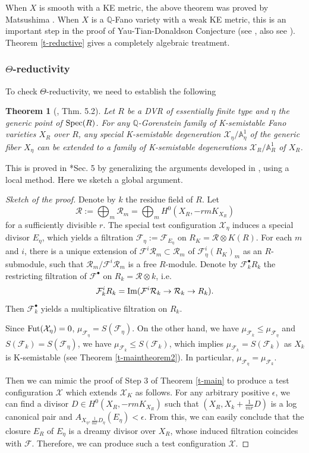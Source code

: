 \documentclass[12pt,reqno]{amsart}%
\newcommand{\bA}{{\mathbb{A} }}
\newcommand{\cR}{{\mathcal{R}}}
\newcommand{\cX}{{\mathcal{X}}}
\newcommand{\cF}{\mathcal{F}}
\newtheorem{thm}{Theorem}[section]
\theoremstyle{definition}
\theoremstyle{remark}
\newcommand{\Fut}{{\rm Fut}}
\newcommand{\Spec}{{\rm Spec}}
\begin{document}
When $X$ is smooth with a KE metric, the above theorem was proved by Matsushima \cite{Mat57}. When $X$ is a $\mathbb{Q}$-Fano variety with a weak KE metric, this is an important step in the proof of Yau-Tian-Donaldson Conjecture (see \cite{CDS, Tia15}, also see \cite{BBEGZ19}). Theorem \ref{t-reductive} gives a completely algebraic treatment. 

\subsubsection{$\Theta$-reductivity}

To check $\Theta$-reductivity, we need to establish the following 
\begin{thm}[{\cite{ABHX19}, Thm. 5.2}]\label{t-thetareductive}
Let $R$ be a DVR of essentially finite type and $\eta$ the generic point of $\Spec(R)$.
For any $\mathbb{Q}$-Gorenstein family of K-semistable Fano varieties $X_R$ over  $R$, any special K-semistable degeneration $\cX_{\eta}/\bA^1_{\eta}$ of the generic fiber $X_{\eta}$ can be extended to a family of K-semistable degenerations $\cX_R/\bA^1_R$ of $X_R$. \end{thm}
This is proved in \cite{ABHX19}*{Sec. 5} by generalizing the arguments developed in \cite{LWX18}, using a local method. Here we sketch a global argument.
\begin{proof}[Sketch of the proof] Denote by $k$ the residue field of $R$.
Let 
$$\cR:=\bigoplus_m \cR_m=\bigoplus_mH^0(X_R, -rmK_{X_R})$$ for a sufficiently divisible $r$.
The special test configuration $\cX_{\eta}$ induces a special divisor $E_{\eta}$, which yields a filtration $ \cF_{\eta}:=\cF_{E_{\eta}}$ on $R_{K}=\cR\otimes K(R)$.  For each $m$ and $i$, there is a unique extension of $ \cF^{i}\cR_m\subset \cR_m$ of $\cF^{i}_{\eta}(R_K)_m$ as an $R$-submodule, such that  $ \cR_m/\cF^i\cR_m$ is a free $R$-module. Denote  by $\cF_k^{\bullet}R_k$ the restricting filtration of $\cF^{\bullet}$ on $R_k=\cR\otimes k$, i.e. 
$$\cF_k^iR_k={\rm Im}(\cF^i\cR_k\to \cR_k\to R_k).$$  Then $\cF_k^{\bullet}$ yields a multiplicative filtration on $R_k$.

Since $\Fut(\cX_{\eta})=0$, $\mu_{\cF_{\eta}}=S(\cF_{\eta})$. On the other hand, we have $\mu_{\cF_k}\le \mu_{\cF_{\eta}}$ and $S(\cF_k)=S(\cF_{\eta})$, we have $\mu_{\cF_k}\le S(\cF_k)$, which implies $\mu_{\cF_k}=S(\cF_k)$ as $X_k$ is K-semistable (see Theorem \ref{t-maintheorem2}). In particular, $\mu_{\cF_{\eta}}=\mu_{\cF_k}$. 

Then we can mimic the proof of Step 3 of Theorem \ref{t-main} to produce a test configuration $\cX$ which extends $\cX_K$ as follows. For any arbitrary positive $\epsilon$, we can find a divisor $D\in H^0(X_R, -rmK_{X_R})$  such that $(X_R, X_k+\frac{1}{mr}D)$ is a log canonical pair and $A_{X_{\eta},\frac{1}{mr}D_{\eta}}(E_{\eta})<\epsilon$. From this, we can easily conclude that the closure $E_R$ of $E_{\eta}$ is a dreamy divisor over $X_R$, whose induced filtration coincides with $\cF$.  Therefore, we can produce such a test configuration $\cX$. 
\end{proof}
\end{document}
